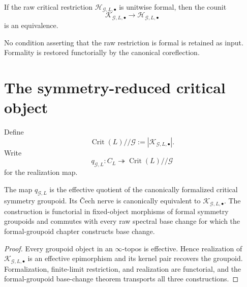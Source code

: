 \begin{corollary}
\label{cor:symmetry-noether-recognition-when-raw-critical-restriction-is-already-formal}
If the raw critical restriction
$\mathcal H_{\mathcal G,L,\bullet}$ is unitwise formal, then the counit
\[
\mathcal K_{\mathcal G,L,\bullet}
\longrightarrow
\mathcal H_{\mathcal G,L,\bullet}
\]
is an equivalence.
\end{corollary}

\begin{remark}
\label{rem:symmetry-noether-no-critical-formality-axiom}
No condition asserting that the raw restriction is formal is retained as
input.  Formality is restored functorially by the canonical coreflection.
\end{remark}


\section{The symmetry-reduced critical object}
\label{sec:symmetry-noether-the-symmetry-reduced-critical-object}

\begin{definition}
\label{def:symmetry-noether-formal-critical-symmetry-quotient}
Define
\[
\boxed{
\operatorname{Crit}(L)//\mathcal G
:=
\left|
\mathcal K_{\mathcal G,L,\bullet}
\right|.
}
\]
Write
\[
q_{\mathcal G,L}:
C_L
\twoheadrightarrow
\operatorname{Crit}(L)//\mathcal G
\]
for the realization map.
\end{definition}

\begin{theorem}
\label{thm:symmetry-noether-effective-critical-quotient}
The map $q_{\mathcal G,L}$ is the effective quotient of the canonically
formalized critical symmetry groupoid.  Its \v{C}ech nerve is canonically
equivalent to $\mathcal K_{\mathcal G,L,\bullet}$.  The construction is
functorial in fixed-object morphisms of formal symmetry groupoids and commutes
with every raw spectral base change for which the formal-groupoid chapter
constructs base change.
\end{theorem}

\begin{proof}
Every groupoid object in an $\infty$-topos is effective.  Hence realization of
$\mathcal K_{\mathcal G,L,\bullet}$ is an effective epimorphism and its kernel
pair recovers the groupoid.  Formalization, finite-limit restriction, and
realization are functorial, and the formal-groupoid base-change theorem transports
all three constructions.
\end{proof}

